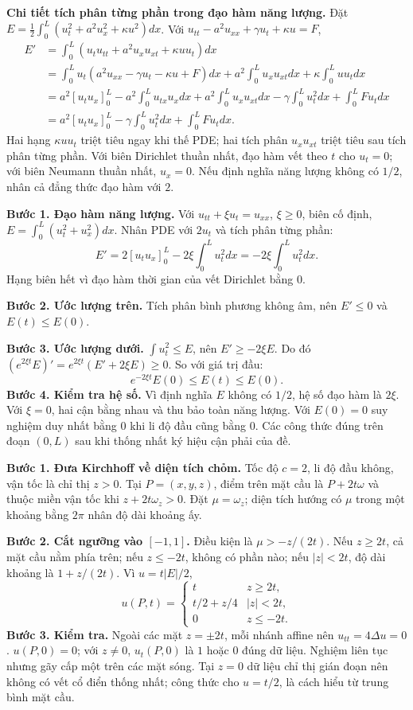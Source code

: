 \textbf{Chi tiết tích phân từng phần trong đạo hàm năng lượng.} Đặt $E=\frac12\int_0^L(u_t^2+a^2u_x^2+\kappa u^2)dx$. Với $u_{tt}-a^2u_{xx}+\gamma u_t+\kappa u=F$,
\[\begin{aligned}
E'&=\int_0^L(u_tu_{tt}+a^2u_xu_{xt}+\kappa uu_t)dx\\
&=\int_0^Lu_t(a^2u_{xx}-\gamma u_t-\kappa u+F)dx
+a^2\int_0^Lu_xu_{xt}dx+\kappa\int_0^Luu_tdx\\
&=a^2[u_tu_x]_0^L-a^2\int_0^Lu_{tx}u_xdx
+a^2\int_0^Lu_xu_{xt}dx-\gamma\int_0^Lu_t^2dx+\int_0^LFu_tdx\\
&=a^2[u_tu_x]_0^L-\gamma\int_0^Lu_t^2dx+\int_0^LFu_tdx.
\end{aligned}\]
Hai hạng $\kappa uu_t$ triệt tiêu ngay khi thế PDE; hai tích phân $u_xu_{xt}$ triệt tiêu sau tích phân từng phần. Với biên Dirichlet thuần nhất, đạo hàm vết theo $t$ cho $u_t=0$; với biên Neumann thuần nhất, $u_x=0$. Nếu định nghĩa năng lượng không có $1/2$, nhân cả đẳng thức đạo hàm với $2$.

\textbf{Bước 1. Đạo hàm năng lượng.} Với $u_{tt}+\xi u_t=u_{xx}$, $\xi\ge0$, biên cố định, $E=\int_0^L(u_t^2+u_x^2)dx$. Nhân PDE với $2u_t$ và tích phân từng phần:
\[E'=2[u_tu_x]_0^L-2\xi\int_0^Lu_t^2dx=-2\xi\int_0^Lu_t^2dx.\]
Hạng biên hết vì đạo hàm thời gian của vết Dirichlet bằng $0$.

\textbf{Bước 2. Ước lượng trên.} Tích phân bình phương không âm, nên $E'\le0$ và $E(t)\le E(0)$.

\textbf{Bước 3. Ước lượng dưới.} $\int u_t^2\le E$, nên $E'\ge-2\xi E$. Do đó $(e^{2\xi t}E)'=e^{2\xi t}(E'+2\xi E)\ge0$. So với giá trị đầu:
\[e^{-2\xi t}E(0)\le E(t)\le E(0).\]
\textbf{Bước 4. Kiểm tra hệ số.} Vì định nghĩa $E$ không có $1/2$, hệ số đạo hàm là $2\xi$. Với $\xi=0$, hai cận bằng nhau và thu bảo toàn năng lượng. Với $E(0)=0$ suy nghiệm duy nhất bằng $0$ khi li độ đầu cũng bằng $0$. Các công thức đúng trên đoạn $(0,L)$ sau khi thống nhất ký hiệu cận phải của đề.

\textbf{Bước 1. Đưa Kirchhoff về diện tích chỏm.} Tốc độ $c=2$, li độ đầu không, vận tốc là chỉ thị $z>0$. Tại $P=(x,y,z)$, điểm trên mặt cầu là $P+2t\omega$ và thuộc miền vận tốc khi $z+2t\omega_z>0$. Đặt $\mu=\omega_z$; diện tích hướng có $\mu$ trong một khoảng bằng $2\pi$ nhân độ dài khoảng ấy.

\textbf{Bước 2. Cắt ngưỡng vào $[-1,1]$.} Điều kiện là $\mu>-z/(2t)$. Nếu $z\ge2t$, cả mặt cầu nằm phía trên; nếu $z\le-2t$, không có phần nào; nếu $|z|<2t$, độ dài khoảng là $1+z/(2t)$. Vì $u=t|E|/2$,
\[u(P,t)=\begin{cases}t&z\ge2t,\\t/2+z/4&|z|<2t,\\0&z\le-2t.\end{cases}\]
\textbf{Bước 3. Kiểm tra.} Ngoài các mặt $z=\pm2t$, mỗi nhánh affine nên $u_{tt}=4\Delta u=0$. $u(P,0)=0$; với $z\ne0$, $u_t(P,0)$ là $1$ hoặc $0$ đúng dữ liệu. Nghiệm liên tục nhưng gãy cấp một trên các mặt sóng. Tại $z=0$ dữ liệu chỉ thị gián đoạn nên không có vết cổ điển thống nhất; công thức cho $u=t/2$, là cách hiểu từ trung bình mặt cầu.

